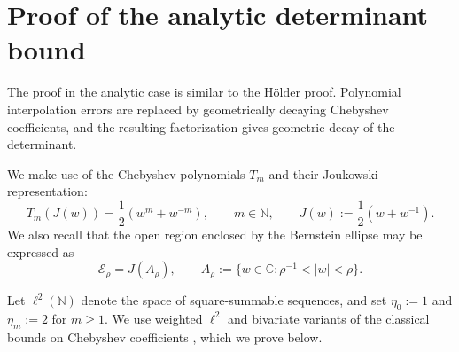 \documentclass[11pt]{article}
\theoremstyle{definition}
\theoremstyle{remark}
\newcommand{\C}{\mathbb{C}}
\newcommand{\cE}{\mathcal{E}}
\newcommand{\abs}[1]{\left\lvert #1\right\rvert}
\begin{document}
\section{Proof of the analytic determinant bound}
\label{sec:one-dimensional-analytic-estimates}

The proof in the analytic case is similar to the H\"older proof. Polynomial
interpolation errors are replaced by geometrically decaying Chebyshev
coefficients, and the resulting factorization gives geometric decay of the
determinant.

We make use of the Chebyshev polynomials $T_m$ and their Joukowski
representation:
\[
    T_m(J(w))
    =
    \frac12\left(w^m+w^{-m}\right),
    \qquad
    m\in\mathbb N,
    \qquad
    J(w):=\frac12(w+w^{-1}).
\]
We also recall that the open region enclosed by the Bernstein ellipse may
be expressed as
\[
    \cE_\rho=J(A_\rho),
    \qquad
    A_\rho:=\{w\in\C:\rho^{-1}<\abs{w}<\rho\}.
\]

Let $\ell^2(\mathbb N)$ denote the space of square-summable
sequences, and set $\eta_0:=1$ and $\eta_m:=2$ for $m\ge1$.
We use weighted $\ell^2$ and bivariate variants of the classical bounds
on Chebyshev coefficients
\cite[Chapter~8, Theorem~8.1]{Trefethen2019}, which we prove below.
\end{document}

